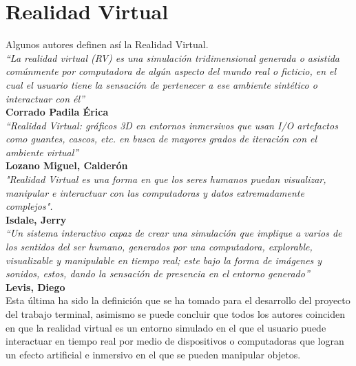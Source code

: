 \section{Realidad Virtual}
Algunos autores definen así la Realidad Virtual.\\
\newline
\textit{“La realidad virtual (RV) es una simulación tridimensional generada o asistida comúnmente por computadora de algún aspecto del mundo real o ficticio, en el cual 
el usuario tiene la sensación de pertenecer a ese ambiente sintético o interactuar con él”}\cite{web6}\\ 
\textbf{Corrado Padila Érica}\\
\newline
\textit{“Realidad Virtual: gráficos 3D en entornos inmersivos que usan I/O
artefactos como guantes, cascos, etc. en busca de mayores grados de iteración
con el ambiente virtual”\cite{web7}}\\ 
\textbf{Lozano Miguel, Calderón}\\
\newline
\textit{"Realidad Virtual es una forma en que los seres humanos puedan
visualizar, manipular e interactuar con las computadoras y datos extremadamente
complejos".\cite{web8}}\\
\textbf{Isdale, Jerry}\\
\newline
\textit{“Un sistema interactivo capaz de crear una simulación que implique a varios de los sentidos del ser humano, generados por una computadora, explorable, visualizable y manipulable 
en tiempo real; este bajo la forma de imágenes y sonidos, estos, dando la sensación de presencia en el entorno generado”\cite{web9}}\\
\textbf{Levis, Diego}\\
\newline
Esta última ha sido la definición que se ha tomado para el desarrollo del proyecto del trabajo terminal, asimismo se puede concluir que todos los autores coinciden en que la 
realidad virtual es un entorno simulado en el que el usuario puede interactuar en tiempo real por medio
de dispositivos o computadoras que logran un efecto artificial e inmersivo en el que se pueden manipular objetos.

